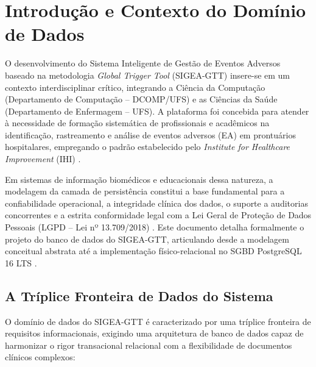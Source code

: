 \chapter{Introdução e Contexto do Domínio de Dados}
\label{cap_introducao_dados}

O desenvolvimento do Sistema Inteligente de Gestão de Eventos Adversos baseado na metodologia \textit{Global Trigger Tool} (SIGEA-GTT) insere-se em um contexto interdisciplinar crítico, integrando a Ciência da Computação (Departamento de Computação -- DCOMP/UFS) e as Ciências da Saúde (Departamento de Enfermagem -- UFS). A plataforma foi concebida para atender à necessidade de formação sistemática de profissionais e acadêmicos na identificação, rastreamento e análise de eventos adversos (EA) em prontuários hospitalares, empregando o padrão estabelecido pelo \textit{Institute for Healthcare Improvement} (IHI) \cite{ihi2009}.

Em sistemas de informação biomédicos e educacionais dessa natureza, a modelagem da camada de persistência constitui a base fundamental para a confiabilidade operacional, a integridade clínica dos dados, o suporte a auditorias concorrentes e a estrita conformidade legal com a Lei Geral de Proteção de Dados Pessoais (LGPD -- Lei nº 13.709/2018) \cite{lgpd2018}. Este documento detalha formalmente o projeto do banco de dados do SIGEA-GTT, articulando desde a modelagem conceitual abstrata até a implementação físico-relacional no SGBD PostgreSQL 16 LTS \cite{postgresql2024}.

\section{A Tríplice Fronteira de Dados do Sistema}
\label{sec_triplice_fronteira}

O domínio de dados do SIGEA-GTT é caracterizado por uma tríplice fronteira de requisitos informacionais, exigindo uma arquitetura de banco de dados capaz de harmonizar o rigor transacional relacional com a flexibilidade de documentos clínicos complexos:

